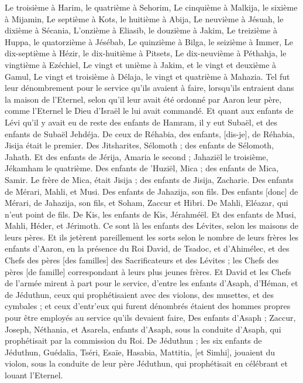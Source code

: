 \begin{multicols}{2}
Le troisième à Harim, le quatrième à Sehorim,
Le cinquième à Malkija, le sixième à Mijamin,
Le septième à Kots, le huitième à Abija,
Le neuvième à Jésuah, le dixième à Sécania,
L'onzième à Eliasib, le douzième à Jakim,
Le treizième à Huppa, le quatorzième à Jésébab,
Le quinzième à Bilga, le seizième à Immer,
Le dix-septième à Hézir, le dix-huitième à Pitsets,
Le dix-neuvième à Péthahja, le vingtième à Ezéchiel,
Le vingt et unième à Jakim, et le vingt et deuxième à Gamul,
Le vingt et troisième à Délaja, le vingt et quatrième à Mahazia.
Tel fut leur dénombrement pour le service qu'ils avaient à faire, lorsqu'ils entraient dans la maison de l'Eternel, selon qu'il leur avait été ordonné par Aaron leur père, comme l'Eternel le Dieu d'Israël le lui avait commandé.
Et quant aux enfants de Lévi qu'il y avait eu de reste des enfants de Hamram, il y eut Subaël, et des enfants de Subaël Jehdéja.
De ceux de Réhabia, des enfants, [dis-je], de Réhabia, Jisija était le premier.
Des Jitsharites, Sélomoth ; des enfants de Sélomoth, Jahath.
Et des enfants de Jérija, Amaria le second ; Jahaziël le troisième, Jékamham le quatrième.
Des enfants de 'Huziël, Mica ; des enfants de Mica, Samir.
Le frère de Mica, était Jisija ; des enfants de Jisija, Zacharie.
Des enfants de Mérari, Mahli, et Musi. Des enfants de Jahazija, son fils.
Des enfants [donc] de Mérari, de Jahazija, son fils, et Soham, Zaccur et Hibri.
De Mahli, Eléazar, qui n'eut point de fils.
De Kis, les enfants de Kis, Jérahméël.
Et des enfants de Musi, Mahli, Héder, et Jérimoth. Ce sont là les enfants des Lévites, selon les maisons de leurs pères.
Et ils jetèrent pareillement les sorts selon le nombre de leurs frères les enfants d'Aaron, en la présence du Roi David, de Tsadoc, et d'Ahimélec, et des Chefs des pères [des familles] des Sacrificateurs et des Lévites ; les Chefs des pères [de famille] correspondant à leurs plus jeunes frères.
\VerseOne{}Et David et les Chefs de l'armée mirent à part pour le service, d'entre les enfants d'Asaph, d'Héman, et de Jéduthun, ceux qui prophétisaient avec des violons, des musettes, et des cymbales ; et ceux d'entr'eux qui furent dénombrés étaient des hommes propres pour être employés au service qu'ils devaient faire,
Des enfants d'Asaph ; Zaccur, Joseph, Néthania, et Asarela, enfants d'Asaph, sous la conduite d'Asaph, qui prophétisait par la commission du Roi.
De Jéduthun ; les six enfants de Jéduthun, Guédalia, Tséri, Esaïe, Hasabia, Mattitia, [et Simhi], jouaient du violon, sous la conduite de leur père Jéduthun, qui prophétisait en célébrant et louant l'Eternel.

\end{multicols}
